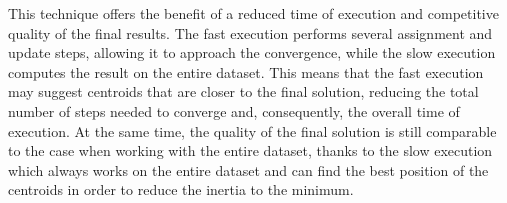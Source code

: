 This technique offers the benefit of a reduced time of execution and competitive quality of the final results.
The fast execution performs several assignment and update steps, allowing it to approach the convergence, while the slow execution computes the result on the entire dataset. This means that the fast execution may suggest centroids that are closer to the final solution, reducing the total number of steps needed to converge and, consequently, the overall time of execution. 
At the same time, the quality of the final solution is still comparable to the case when working with the entire dataset, thanks to the slow execution which always works on the entire dataset and can find the best position of the centroids in order to reduce the inertia to the minimum.




